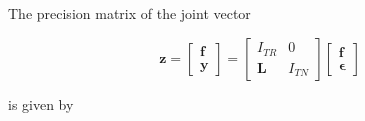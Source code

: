 \documentclass[notitlepage,a4paper,12pt]{article}
\begin{document}
The precision matrix of the joint vector 

\begin{equation}
    \mathbf{z} = 
    \begin{bmatrix}
        \mathbf{f} \\
        \mathbf{y}
    \end{bmatrix}
    = 
    \begin{bmatrix}
        I_{TR} & 0 \\
        \mathbf{L} & I_{TN} 
    \end{bmatrix}
    \begin{bmatrix}
        \mathbf{f} \\
        \mathbf{\epsilon}
    \end{bmatrix} 
\end{equation}

is given by
\end{document}
